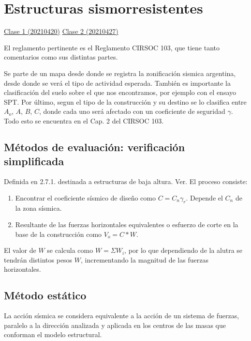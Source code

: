 \documentclass[../main.tex]{subfiles}
\begin{document}
\section{Estructuras sismorresistentes}

\href{https://youtu.be/6VVqDEFBOIk}{Clase 1 (20210420)}
\href{https://youtu.be/uCQmAC-F8G8}{Clase 2 (20210427)}

El reglamento pertinente es el Reglamento CIRSOC 103, que tiene tanto comentarios
como sus distintas partes.

Se parte de un mapa desde donde se registra la zonificación sismica argentina, 
desde donde se verá el tipo de actividad esperada. También es importante la
clasificación del suelo sobre el que nos encontramos, por ejemplo con el 
ensayo SPT. Por último, segun el tipo de la construcción y su destino se lo clasifica
entre $A_o$, $A$, $B$, $C$, donde cada uno será afectado con un coeficiente de
seguridad $\gamma$. Todo esto se encuentra en el Cap. 2 del CIRSOC 103.

\subsection{Métodos de evaluación: verificación simplificada}

Definida en 2.7.1. destinada a estructuras de baja altura. Ver. %
El proceso consiste:

\begin{enumerate}
  \item Encontrar el coeficiente sísmico de diseño como $C=C_n \gamma_r$. Depende
    el $C_n$ de la zona sísmica.
   \item Resultante de las fuerzas horizontales equivalentes o esfuerzo de corte
     en la base de la construcción como $V_o = C*W$.
\end{enumerate}

El valor de $W$ se calcula como  $W=\Sigma W_i$, por lo que dependiendo de la alutra
se tendrán distintos pesos $W$, incrementando la magnitud de las fuerzas 
horizontales.


\subsection{Método estático}

La acción sísmica se considera equivalente a la acción de un sistema de fuerzas,
paralelo a la dirección analizada y aplicada en los centros de las masas que 
conforman el modelo estructural.
\end{document}

